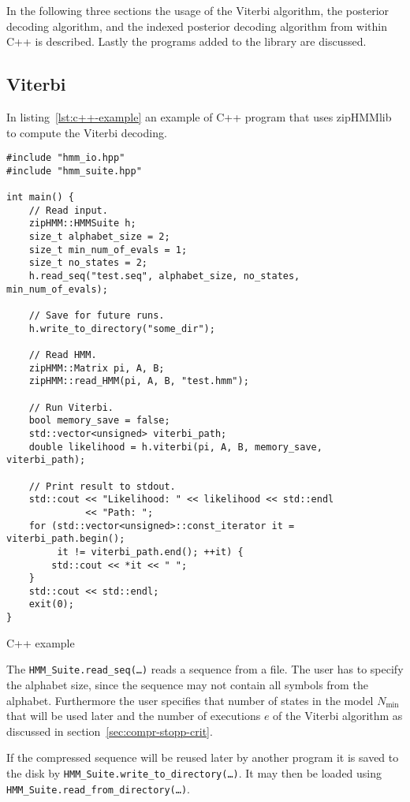 In the following three sections the usage of the Viterbi algorithm, the
posterior decoding algorithm, and the indexed posterior decoding algorithm from
within C++ is described. Lastly the programs added to the library are
discussed.

\subsection{Viterbi}

In listing~\ref{lst:c++-example} an example of C++ program that uses zipHMMlib
to compute the Viterbi decoding.

\begin{listing}
\begin{verbatim}
#include "hmm_io.hpp"
#include "hmm_suite.hpp"

int main() {
    // Read input.
    zipHMM::HMMSuite h;
    size_t alphabet_size = 2;
    size_t min_num_of_evals = 1;
    size_t no_states = 2;
    h.read_seq("test.seq", alphabet_size, no_states, min_num_of_evals);

    // Save for future runs.
    h.write_to_directory("some_dir");

    // Read HMM.
    zipHMM::Matrix pi, A, B;
    zipHMM::read_HMM(pi, A, B, "test.hmm");

    // Run Viterbi.
    bool memory_save = false;
    std::vector<unsigned> viterbi_path;
    double likelihood = h.viterbi(pi, A, B, memory_save, viterbi_path);

    // Print result to stdout.
    std::cout << "Likelihood: " << likelihood << std::endl
              << "Path: ";
    for (std::vector<unsigned>::const_iterator it = viterbi_path.begin();
         it != viterbi_path.end(); ++it) {
        std::cout << *it << " ";
    }
    std::cout << std::endl;
    exit(0);
}
\end{verbatim}
\caption{C++ example}
\label{lst:c++-example}
\end{listing}

The \texttt{HMM\_Suite.read\_seq(\dots)} reads a sequence from a file. The user
has to specify the alphabet size, since the sequence may not contain all
symbols from the alphabet. Furthermore the user specifies that number of states
in the model $N_{\min}$ that will be used later and the number of executions
$e$ of the Viterbi algorithm as discussed in
section~\ref{sec:compr-stopp-crit}.

If the compressed sequence will be reused later by another program it is saved
to the disk by \texttt{HMM\_Suite.write\_to\_directory(\dots)}. It may then be
loaded using \texttt{HMM\_Suite.read\_from\_directory(\dots)}.

